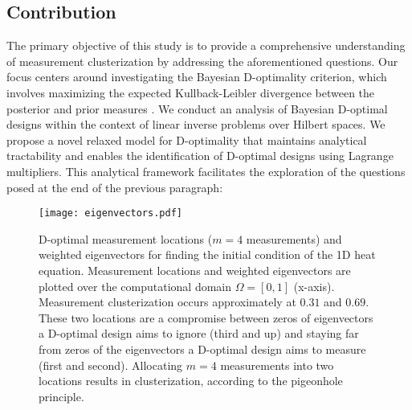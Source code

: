\subsection{Contribution}
The primary objective of this study is to provide a comprehensive
understanding of measurement clusterization by addressing the
aforementioned questions. Our focus centers around investigating the
Bayesian D-optimality criterion, which involves maximizing the
expected Kullback-Leibler divergence between the posterior and prior
measures \cite{CoverThomas91, Chaloner1995}. We conduct an analysis of
Bayesian D-optimal designs within the context of linear inverse
problems over Hilbert spaces. We propose a novel relaxed model for
D-optimality that maintains analytical tractability and enables the
identification of D-optimal designs using Lagrange multipliers. This
analytical framework facilitates the exploration of the questions
posed at the end of the previous paragraph:

\begin{figure}
    \centering
    \texttt{[image: eigenvectors.pdf]}
    \caption{D-optimal measurement locations ($m=4$ measurements) and
      weighted eigenvectors for finding the initial condition of
      the 1D heat equation. Measurement locations and weighted
      eigenvectors are plotted over the computational domain $\Omega =
      [0, 1]$ (x-axis). Measurement clusterization occurs
      approximately at $0.31$ and $0.69$. These two locations are a
      compromise between zeros of eigenvectors a D-optimal design aims
      to ignore (third and up) and staying far from zeros of the
      eigenvectors a D-optimal design aims to measure (first and
      second). Allocating $m=4$ measurements into two locations
      results in clusterization, according to the pigeonhole
      principle.}
  \label{fig:why}
\end{figure}

